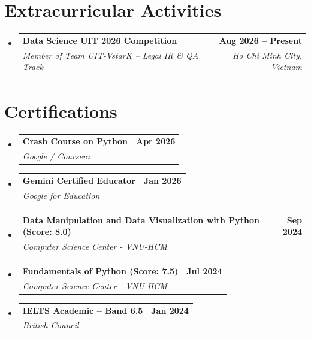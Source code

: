 \documentclass[letterpaper,11pt]{article}
\makeatletter
\newcommand{\resumeEduHeading}[4]{
  \vspace{-2pt}\item
    \begin{tabular*}{1.0\textwidth}[t]{l@{\extracolsep{\fill}}r}
      \textbf{#1} & \textbf{#2} \\
      \textit{\small#3} & \textit{\small #4} \\
    \end{tabular*}\vspace{-7pt}
}
\newcommand{\resumeCertHeading}[3]{
    \item
    \begin{tabular*}{1.0\textwidth}{l@{\extracolsep{\fill}}r}
      \textbf{#1} & \textbf{#2} \\
      \textit{\small#3} & \\
    \end{tabular*}\vspace{-7pt}
}
\newcommand{\resumeSubHeadingListStart}{\begin{itemize}[leftmargin=0.0in, label={}]}
\newcommand{\resumeSubHeadingListEnd}{\end{itemize}}
\makeatother
\begin{document}
\section{Extracurricular Activities}
  \resumeSubHeadingListStart
    \resumeEduHeading
      {Data Science UIT 2026 Competition}{Aug 2026 -- Present}
      {Member of Team UIT-VstarK -- Legal IR \& QA Track}{Ho Chi Minh City, Vietnam}
  \resumeSubHeadingListEnd

\section{Certifications}
  \resumeSubHeadingListStart
    \resumeCertHeading
        {Crash Course on Python}{Apr 2026}
        {Google / Coursera}
    \resumeCertHeading
        {Gemini Certified Educator}{Jan 2026}
        {Google for Education}
    \resumeCertHeading
        {Data Manipulation and Data Visualization with Python (Score: 8.0)}{Sep 2024}
        {Computer Science Center - VNU-HCM}
    \resumeCertHeading
        {Fundamentals of Python (Score: 7.5)}{Jul 2024}
        {Computer Science Center - VNU-HCM}
    \resumeCertHeading
        {IELTS Academic -- Band 6.5}{Jan 2024}
        {British Council}
  \resumeSubHeadingListEnd
\end{document}
